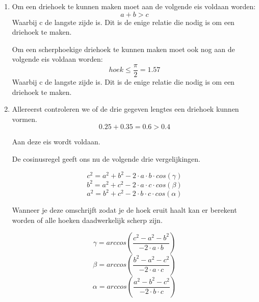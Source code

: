 \documentclass{article}
\begin{document}
\begin{enumerate}[label=(\Alph*)]

\item Om een driehoek te kunnen maken moet aan de volgende eis voldaan worden:
\begin{equation} a+b > c\end{equation}
Waarbij c de langste zijde is. Dit is de enige relatie die nodig is om een driehoek te maken.

Om een scherphoekige driehoek te kunnen maken moet ook nog aan de volgende eis voldaan worden:
\begin{equation} hoek \leq \frac{\pi}{2} = 1.57 \end{equation}
Waarbij c de langste zijde is. Dit is de enige relatie die nodig is om een driehoek te maken.

\item Allereerst controleren we of de drie gegeven lengtes een driehoek kunnen vormen.
\begin{equation} 0.25+0.35 = 0.6 > 0.4\end{equation}

Aan deze eis wordt voldaan.

De cosinusregel geeft ons nu de volgende drie vergelijkingen. 

\begin{equation} c^{2} = a^{2} + b^{2} - 2 \cdot a \cdot b \cdot cos(\gamma) \end{equation}
\begin{equation} b^{2} = a^{2} + c^{2} - 2 \cdot a \cdot c \cdot cos(\beta) \end{equation}
\begin{equation} a^{2} = b^{2} + c^{2} - 2 \cdot b \cdot c \cdot cos(\alpha) \end{equation}

Wanneer je deze omschrijft zodat je de hoek eruit haalt kan er berekent worden of alle hoeken daadwerkelijk scherp zijn.

\begin{equation} \gamma = arccos(\frac{c^{2} - a^{2} - b^{2}}{- 2 \cdot a \cdot b}) \end{equation}
\begin{equation} \beta = arccos(\frac{b^{2} - a^{2} - c^{2}}{- 2 \cdot a \cdot c}) \end{equation}
\begin{equation} \alpha = arccos(\frac{a^{2} - b^{2} - c^{2}}{- 2 \cdot b \cdot c}) \end{equation}


\end{enumerate}
\end{document}
